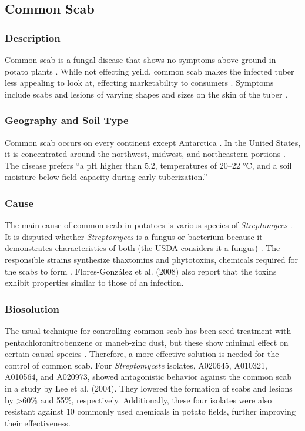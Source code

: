 \documentclass[12pt]{article}
\begin{document}
\subsection{Common Scab}

\subsubsection{Description}

Common scab is a fungal disease that shows no symptoms above ground in potato plants \autocite{rich2013potato}. While not effecting yeild, common scab makes the infected tuber less appealing to look at, effecting marketability to consumers \autocite{rich2013potato}. Symptoms include scabs and lesions of varying shapes and sizes on the skin of the tuber \autocite{dees2012search}.

\subsubsection{Geography and Soil Type}

Common scab occurs on every continent except Antarctica \autocite{rich2013potato}. In the United States, it is concentrated around the northwest, midwest, and northeastern portions \autocite{braun2017potato}. The disease prefers ``a pH
higher than 5.2, temperatures of 20–22 °C, and a soil moisture
below field capacity during early tuberization.'' \autocite{braun2017potato, archuleta1981cause}

\subsubsection{Cause}

The main cause of common scab in potatoes is various species of \emph{Streptomyces} \autocite{flores2008detection}. It is disputed whether \emph{Streptomyces} is a fungus or bacterium because it demonstrates characteristics of both (the USDA considers it a fungus) \autocite{rich2013potato}. The responsible strains synthesize thaxtomins and phytotoxins, chemicals required for the scabs to form \autocite{flores2008detection}. Flores-Gonz{\'a}lez et al. (2008) also report that the toxins exhibit properties similar to those of an infection.

\subsubsection{Biosolution}

The usual technique for controlling common scab has been seed treatment with pentachloronitrobenzene or maneb-zinc dust, but these show minimal effect on certain causal species \autocite{lee2004vivo}. Therefore, a more effective solution is needed for the control of common scab. Four \emph{Streptomycete} isolates, A020645, A010321, A010564, and A020973, showed antagonistic behavior against the common scab in a study by Lee et al. (2004). They lowered the formation of scabs and lesions by \textgreater 60\% and 55\%, respectively. Additionally, these four isolates were also resistant against 10 commonly used chemicals in potato fields, further improving their effectiveness.
\end{document}
